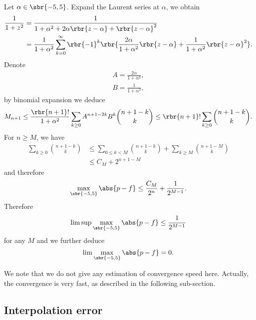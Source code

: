\documentclass[english, nochinese]{pnote}
\begin{document}
Let $ \alpha \in \sbr{ -5, 5 } $. Expand the Laurent series at $\alpha$, we obtain
\begin{equation}
\begin{split}
\frac{1}{ 1 + z^2 } &= \frac{1}{ 1 + \alpha^2 + 2 \alpha \rbr{ z - \alpha } + \rbr{ z - \alpha }^2 } \\
&= \frac{1}{ 1 + \alpha^2 } \sum_{ k = 0 }^{\infty} \rbr{-1}^k \rbr{ \frac{ 2 \alpha }{ 1 + \alpha^2 } \rbr{ z - \alpha } + \frac{1}{ 1 + \alpha^2 } \rbr{ z - \alpha }^2 }.
\end{split}
\end{equation}
Denote
\begin{gather}
A = \frac{ 2 \alpha }{ 1 + \alpha^2 }, \\
B = \frac{1}{ 1 + \alpha^2 },
\end{gather}
by binomial expansion we deduce
\begin{equation}
M_{ n + 1 } \le \frac{ \rbr{ n + 1 } ! }{ 1 + \alpha^2 } \sum_{ k \ge 0 } A^{ n + 1 - 2 k } B^k \binom{ n + 1 - k }{k} \le \rbr{ n + 1 } ! \sum_{ k \ge 0 } \binom{ n + 1 - k }{k}.
\end{equation}
For $ n \ge M $, we have
\begin{equation}
\begin{split}
\sum_{ k \ge 0 } \binom{ n + 1 - k }{k} &\le \sum_{ 0 \le k < M } \binom{ n + 1 - k }{k} + \sum_{ k \ge M } \binom{  n + 1 - M }{k} \\
&\le C_M + 2^{ n + 1 - M }
\end{split}
\end{equation}
and therefore
\begin{equation}
\max_{ \sbr{ -5, 5 } } \abs{ p - f } \le \frac{C_M}{2^n} + \frac{1}{2^{ M - 1 }}.
\end{equation}
Therefore
\begin{equation}
\limsup \max_{ \sbr{ -5, 5 } } \abs{ p - f } \le \frac{1}{2^{ M - 1 }}
\end{equation}
for any $M$ and we further deduce
\begin{equation}
\lim \max_{ \sbr{ -5, 5 } } \abs{ p - f } = 0.
\end{equation}

We note that we do not give any estimation of convergence speed here. Actually, the convergence is very fast, as described in the following sub-section.

\subsection{Interpolation error}
\end{document}
